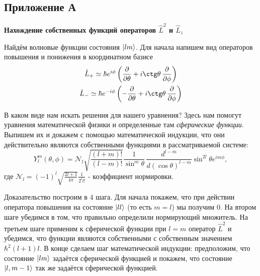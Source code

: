 \setcounter{figure}{0}  
\begin{center}
    \section{Приложение А}\label{appendix:A}
    \textbf{\Large{Нахождение собственных функций операторов $\hat{L}^2$ и $\hat{L}_z$}}
\end{center}

Найдём волновые функции состояния $\ket{lm}$. Для начала напишем вид операторов повышения и понижения в координатном базисе
\begin{gather*}
\hat{L}_+ \simeq \hbar e^{i\phi}\left(\frac{\partial}{\partial \theta} + i \ctg\theta\,\frac{\partial}{\partial \phi} \right)\\
\hat{L}_- \simeq \hbar e^{-i\phi}\left(-\frac{\partial}{\partial \theta} + i \ctg\theta\,\frac{\partial}{\partial \phi} \right)
\end{gather*}

В каком виде нам искать решения для нашего уравнения? Здесь нам помогут уравнения математической физики и определенные там \textit{сферические функции}. Выпишем их и докажем с помощью математической индукции, что они действительно являются собственными функциями в рассматриваемой системе:
\[
Y^m_l(\theta, \phi) = \mathcal{N}_l\sqrt{\frac{(l+m)!}{(l-m)!}} \frac{1}{\sin^{m}\theta}\,\frac{d^{l-m}}{d(\cos\theta)^{l-m}}\sin^{2l}\theta e^{im\phi},
\]
где $\mathcal{N}_l = (-1)^l \sqrt{\frac{2l+1}{4\pi}}\frac{1}{2^l l!}$ - коэффициент нормировки.

Доказательство построим в 4 шага. Для начала покажем, что при действии оператора повышения на состояние $\ket{ll}$ (то есть $m = l$) мы получим 0. На втором шаге убедимся в том, что правильно определили нормирующий множитель. На третьем шаге применим к сферической функции при $l=m$ оператор $\hat{L}^2$ и убедимся, что функции являются собственными с собственным значением $\hbar^2(l+1)l$. В конце сделаем шаг математической индукции: предположим, что состояние $\ket{lm}$ задаётся сферической функцией и покажем, что состояние $\ket{l, m-1}$ так же задаётся сферической функцией.

